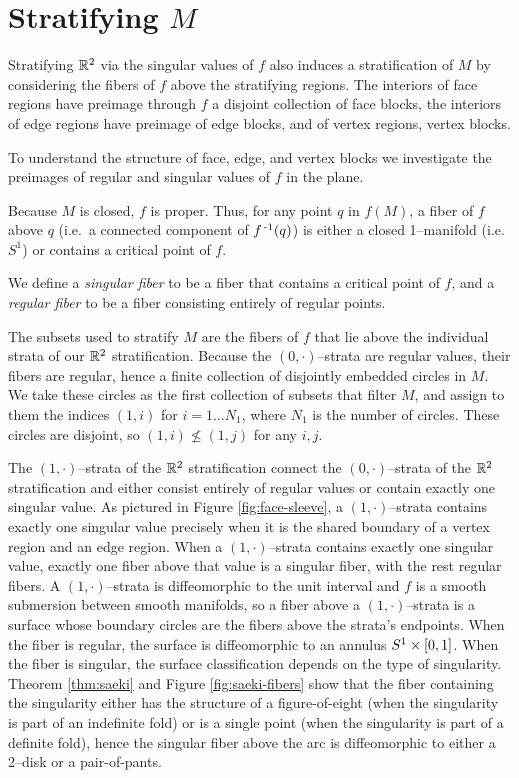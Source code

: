 \section{Stratifying $M$}

Stratifying $\mathbb{R}^2$ via the singular values of $f$ also induces a stratification of $M$
by considering the fibers of $f$ above the stratifying regions.
The interiors of face regions have preimage through $f$ a disjoint collection of face blocks, the interiors of edge regions have preimage of edge blocks, and of vertex regions, vertex blocks.

To understand the structure of face, edge, and vertex blocks we investigate the preimages of regular and singular values of $f$ in the plane.
\begin{defn}
	Because $M$ is closed, $f$ is proper.
	Thus, for any point $q$ in $f(M)$, a fiber of $f$ above $q$ (i.e.\ a connected component of $f^{\,\text{-}1}(q)$) is either a closed 1--manifold (i.e.\ $S^1$) or contains a critical point of $f$.
	
	We define a \emph{singular fiber} to be a fiber that contains a critical point of $f$, and a \emph{regular fiber} to be a fiber consisting entirely of regular points.	
\end{defn}

The subsets used to stratify $M$ are the fibers of $f$ that lie above the individual strata of our $\mathbb{R}^2$ stratification.
Because the $(0,\cdot)$--strata are regular values, their fibers are regular, hence a finite collection of disjointly embedded circles in $M$.
We take these circles as the first collection of subsets that filter $M$, and assign to them the indices $(1,i)$ for $i = 1\dots N_1$, where $N_1$ is the number of circles.
These circles are disjoint, so $(1,i)\nleq (1,j)$ for any $i,j$.

The $(1,\cdot)$--strata of the $\mathbb{R}^2$ stratification connect the $(0,\cdot)$--strata of the $\mathbb{R}^2$ stratification and either consist entirely of regular values or contain exactly one singular value.
As pictured in Figure \ref{fig:face-sleeve}, a $(1,\cdot)$--strata contains exactly one singular value precisely when it is the shared boundary of a vertex region and an edge region.
When a $(1,\cdot)$--strata contains exactly one singular value, exactly one fiber above that value is a singular fiber, with the rest regular fibers.
A $(1,\cdot)$--strata is diffeomorphic to the unit interval and $f$ is a smooth submersion between smooth manifolds, so a fiber above a $(1,\cdot)$--strata is a surface whose boundary circles are the fibers above the strata's endpoints.
When the fiber is regular, the surface is diffeomorphic to an annulus $S^1\times[0,1]$.
When the fiber is singular, the surface classification depends on the type of singularity.
Theorem \ref{thm:saeki} and Figure \ref{fig:saeki-fibers} show that the fiber containing the singularity either has the structure of a figure-of-eight (when the singularity is part of an indefinite fold) or is a single point (when the singularity is part of a definite fold), hence the singular fiber above the arc is diffeomorphic to either a 2--disk or a pair-of-pants.

